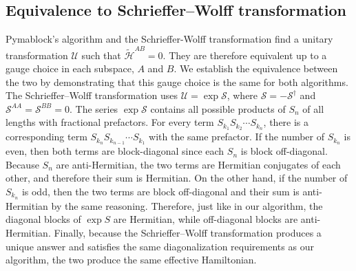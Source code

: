 \subsection{Equivalence to Schrieffer--Wolff transformation}
\label{seq:SW_equivalence}
Pymablock's algorithm and the Schrieffer-Wolff transformation find a unitary
transformation $\mathcal{U}$ such that $\tilde{\mathcal{H}}^{AB}=0$.
They are therefore equivalent up to a gauge choice in each subspace, $A$ and
$B$.
We establish the equivalence between the two by demonstrating that this gauge
choice is the same for both algorithms.
The Schrieffer--Wolff transformation uses $\mathcal{U} = \exp \mathcal{S}$,
where $\mathcal{S} = -\mathcal{S}^\dagger$ and $\mathcal{S}^{AA} =
\mathcal{S}^{BB} = 0$.
The series $\exp\mathcal{S}$ contains all possible products of $S_n$ of all
lengths with fractional prefactors.
For every term $S_{k_1}S_{k_2}\cdots S_{k_n}$, there is a corresponding term
$S_{k_n}S_{k_{n-1}}\cdots S_{k_1}$ with the same prefactor.
If the number of $S_{k_n}$ is even, then both terms are block-diagonal since
each $S_n$ is block off-diagonal.
Because $S_n$ are anti-Hermitian, the two terms are Hermitian conjugates of each
other, and therefore their sum is Hermitian.
On the other hand, if the number of $S_{k_n}$ is odd, then the two terms are
block off-diagonal and their sum is anti-Hermitian by the same reasoning.
Therefore, just like in our algorithm, the diagonal blocks of $\exp S$ are
Hermitian, while off-diagonal blocks are anti-Hermitian.
Finally, because the Schrieffer--Wolff transformation produces a unique answer
and satisfies the same diagonalization requirements as our algorithm, the two
produce the same effective Hamiltonian.

